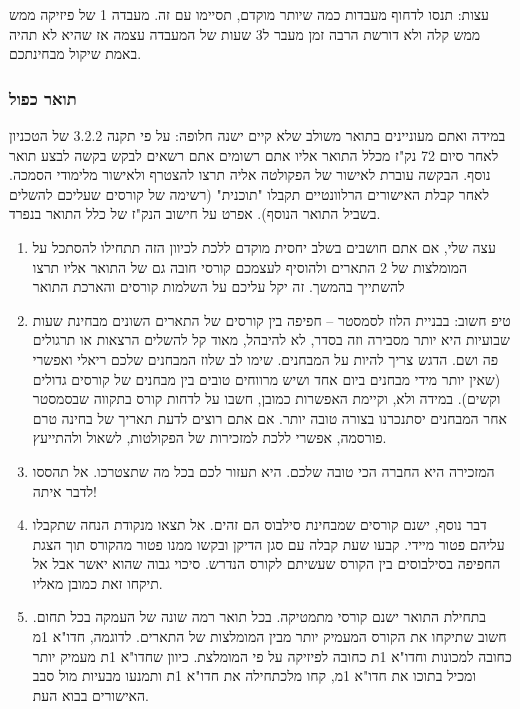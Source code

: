 \documentclass[a4paper,12pt]{article}
\begin{document}
עצות: תנסו לדחוף מעבדות כמה שיותר מוקדם, תסיימו עם זה. מעבדה 1 של פיזיקה ממש ממש קלה ולא דורשת הרבה זמן מעבר ל3 שעות של המעבדה עצמה אז שהיא לא תהיה באמת שיקול מבחינתכם.

\subsubsection{תואר כפול}

במידה ואתם מעוניינים בתואר משולב שלא קיים ישנה חלופה: על פי תקנה 3.2.2 של הטכניון לאחר סיום 72 נק"ז מכלל התואר אליו אתם רשומים אתם רשאים לבקש בקשה לבצע תואר נוסף. הבקשה עוברת לאישור של הפקולטה אליה תרצו להצטרף ולאישור מלימודי הסמכה. לאחר קבלת האישורים הרלוונטיים תקבלו "תוכנית" (רשימה של קורסים שעליכם להשלים בשביל התואר הנוסף).
אפרט על חישוב הנק"ז של כלל התואר בנפרד.

\begin{enumerate}
    \item עצה שלי, אם אתם חושבים בשלב יחסית מוקדם ללכת לכיוון הזה תתחילו להסתכל על המומלצות של 2 התארים ולהוסיף לעצמכם קורסי חובה גם של התואר אליו תרצו להשתייך בהמשך. זה יקל עליכם על השלמות קורסים והארכת התואר
    \item טיפ חשוב: בבניית הלוז לסמסטר – חפיפה בין קורסים של התארים השונים מבחינת שעות שבועיות היא יותר מסבירה וזה בסדר, לא להיבהל, מאוד קל להשלים הרצאות או תרגולים פה ושם. הדגש צריך להיות על המבחנים. שימו לב שלוז המבחנים שלכם ריאלי ואפשרי (שאין יותר מידי מבחנים ביום אחד ושיש מרווחים טובים בין מבחנים של קורסים גדולים וקשים). במידה ולא, וקיימת האפשרות כמובן, חשבו על לדחות קורס בתקווה שבסמסטר אחר המבחנים יסתנכרנו בצורה טובה יותר. אם אתם רוצים לדעת תאריך של בחינה טרם פורסמה, אפשרי ללכת למזכירות של הפקולטות, לשאול ולהתייעץ.
    \item המזכירה היא החברה הכי טובה שלכם. היא תעזור לכם בכל מה שתצטרכו. אל תהססו לדבר איתה!
    \item דבר נוסף, ישנם קורסים שמבחינת סילבוס הם זהים. אל תצאו מנקודת הנחה שתקבלו עליהם פטור מיידי. קבעו שעת קבלה עם סגן הדיקן ובקשו ממנו פטור מהקורס תוך הצגת החפיפה בסילבוסים בין הקורס שעשיתם לקורס הנדרש. סיכוי גבוה שהוא יאשר אבל אל תיקחו זאת כמובן מאליו.
    \item בתחילת התואר ישנם קורסי מתמטיקה. בכל תואר רמה שונה של העמקה בכל תחום. חשוב שתיקחו את הקורס המעמיק יותר מבין המומלצות של התארים. לדוגמה, חדו"א 1מ כחובה למכונות וחדו"א 1ת כחובה לפיזיקה על פי המומלצת. כיוון שחדו"א 1ת מעמיק יותר ומכיל בתוכו את חדו"א 1מ, קחו מלכתחילה את חדו"א 1ת ותמנעו מבעיות מול סבב האישורים בבוא העת.
\end{enumerate}
\end{document}
